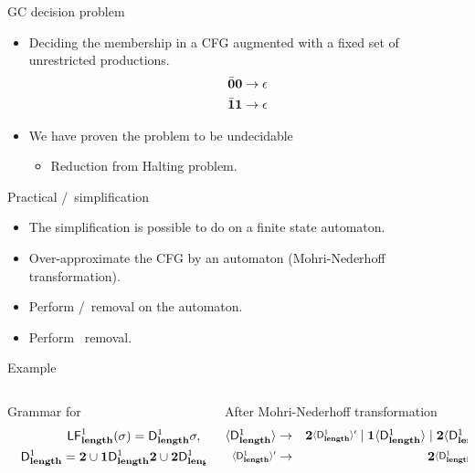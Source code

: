 \documentclass[xcolor=x11names,compress,mathserif]{beamer}
\renewcommand{\(}{\begin{columns}}
\renewcommand{\)}{\end{columns}}
\newcommand{\<}[1]{\begin{column}{#1}}
\renewcommand{\>}{\end{column}}
\begin{document}
\begin{frame}{GC decision problem}
\begin{itemize}
\item Deciding the
  membership in  a CFG augmented  with a
  fixed set of unrestricted productions.
  \begin{align*}
    \bar{\mathbf{0}}\mathbf{0}    \rightarrow    \epsilon\\
    \bar{\mathbf{1}}\mathbf{1}    \rightarrow   \epsilon\\
  \end{align*}
\item We have proven the problem to be undecidable
  \begin{itemize}
  \item Reduction from Halting problem.
  \end{itemize}
\end{itemize}
\end{frame}
\begin{frame}{Practical \bcar/\bcdr\  simplification}

\begin{itemize}
\item The simplification is possible to do on a finite state automaton.
\item Over-approximate the CFG by an automaton
  (Mohri-Nederhoff transformation).
\item Perform \acar/\acdr\ removal on the automaton.
\item Perform \clazy\ removal.
\end{itemize}

\end{frame}
\begin{frame}{Example}
  \scriptsize
  \begin{columns}[c]
    \begin{column}[T]{.5\textwidth}
      {Grammar for }
      \begin{eqnarray*}
        &&  \mathsf{LF}_{\mathit {\mathbf{length}} }^{1}( {\mathit \sigma}) = \mathsf{D}_{\mathit {\mathbf{length}}}^{1}\sigma,~\mbox{and}\\
        &&   \mathsf{D}_{\mathit {\mathbf{length}}}^{1} = {\mathbf{2}} \cup \mathbf{1}\mathsf{D}_{\mathit {\mathbf{length}}}^{1}{\mathbf{2}}
        \cup {\mathbf{2}}\mathsf{D}_{\mathit {\mathbf{length}}}^{1}{{\mathbf{2}}}
      \end{eqnarray*}
    \end{column}
    \begin{column}[T]{.5\textwidth}
      After Mohri-Nederhoff transformation
       \begin{eqnarray*}              
         \var{\Df{\plength}{1}}   &\rightarrow&   \clazy\varnew{\Df{\plength}{1}}
         \mid                 \acdr\var{\Df{\plength}{1}}                 \mid
         \clazy\var{\Df{\plength}{1}}\\  \varnew{\Df{\plength}{1}}  &\rightarrow&
         \clazy\varnew{\Df{\plength}{1}} \mid \epsilon
       \end{eqnarray*}
    \end{column}
  \end{columns}
\end{frame}
\end{document}
